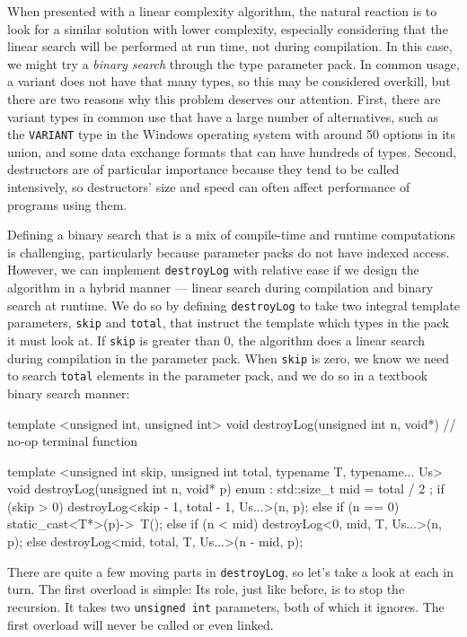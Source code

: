 \noindent When presented with a linear complexity algorithm, the natural reaction
is to look for a similar solution with lower complexity, especially
considering that the linear search will be performed at run time, not
during compilation. In this case, we might try a \emph{binary search}
through the type parameter pack. In common usage, a variant does not
have that many types, so this may be considered overkill, but there are
two reasons why this problem deserves our attention. First, there are
variant types in common use that have a large number of alternatives,
such as the \lstinline!VARIANT! type in the Windows operating system with
around 50 options in its union, and some data exchange formats that can
have hundreds of types. Second, destructors are of particular importance
because they tend to be called intensively, so destructors' size and
speed can often affect performance of programs using them.

Defining a binary search that is a mix of compile-time and runtime
computations is challenging, particularly because parameter packs do not
have indexed access. However, we can implement \lstinline!destroyLog! with
relative ease if we design the algorithm in a hybrid manner --- linear
search during compilation and binary search at runtime. We do so by
defining \lstinline!destroyLog! to take two integral template parameters,
\lstinline!skip! and \lstinline!total!, that instruct the template which types
in the pack it must look at. If \lstinline!skip! is greater than 0, the
algorithm does a linear search during compilation in the parameter pack.
When \lstinline!skip! is zero, we know we need to search \lstinline!total!
elements in the parameter pack, and we do so in a textbook binary search
manner:

\begin{emcppslisting}[emcppsbatch={e38,e39}]
template <unsigned int, unsigned int>
void destroyLog(unsigned int n, void*) // no-op terminal function
{ }

template <unsigned int skip, unsigned int total, typename T, typename... Us>
void destroyLog(unsigned int n, void* p)
{
    enum : std::size_t { mid = total / 2 };
    if (skip > 0)
        destroyLog<skip - 1, total - 1, Us...>(n, p);
    else if (n == 0)
        static_cast<T*>(p)->~T();
    else if (n < mid)
        destroyLog<0, mid, T, Us...>(n, p);
    else
        destroyLog<mid, total, T, Us...>(n - mid, p);
}
\end{emcppslisting}
    

\noindent There are quite a few moving parts in \lstinline!destroyLog!, so let's take
a look at each in turn. The first overload is simple: Its role, just
like before, is to stop the recursion. It takes two
\lstinline!unsigned!~\lstinline!int! parameters, both of which it ignores. The
first overload will never be called or even linked.

